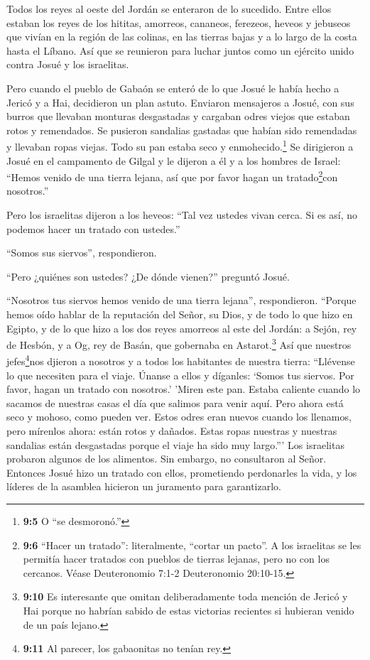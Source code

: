  Todos los reyes al oeste del Jordán se enteraron de lo
sucedido. Entre ellos estaban los reyes de los hititas, amorreos,
cananeos, ferezeos, heveos y jebuseos que vivían en la región de las
colinas, en las tierras bajas y a lo largo de la costa hasta el Líbano.
 Así que se reunieron para luchar juntos como un ejército
unido contra Josué y los israelitas.

 Pero cuando el pueblo de Gabaón se enteró de lo que Josué
le había hecho a Jericó y a Hai,  decidieron un plan astuto.
Enviaron mensajeros a Josué, con sus burros que llevaban monturas
desgastadas y cargaban odres viejos que estaban rotos y remendados.
 Se pusieron sandalias gastadas que habían sido remendadas y
llevaban ropas viejas. Todo su pan estaba seco y enmohecido.\footnote{\textbf{9:5}
  O ``se desmoronó.''}  Se dirigieron a Josué en el
campamento de Gilgal y le dijeron a él y a los hombres de Israel:
``Hemos venido de una tierra lejana, así que por favor hagan un
tratado\footnote{\textbf{9:6} ``Hacer un tratado'': literalmente,
  ``cortar un pacto''. A los israelitas se les permitía hacer tratados
  con pueblos de tierras lejanas, pero no con los cercanos. Véase
  Deuteronomio 7:1-2 Deuteronomio 20:10-15.}con nosotros.''

 Pero los israelitas dijeron a los heveos: ``Tal vez ustedes
vivan cerca. Si es así, no podemos hacer un tratado con ustedes.''

 ``Somos sus siervos'', respondieron.

``Pero ¿quiénes son ustedes? ¿De dónde vienen?'' preguntó Josué.

 ``Nosotros tus siervos hemos venido de una tierra lejana'',
respondieron. ``Porque hemos oído hablar de la reputación del Señor, su
Dios, y de todo lo que hizo en Egipto,  y de lo que hizo a
los dos reyes amorreos al este del Jordán: a Sejón, rey de Hesbón, y a
Og, rey de Basán, que gobernaba en Astarot.\footnote{\textbf{9:10} Es
  interesante que omitan deliberadamente toda mención de Jericó y Hai
  porque no habrían sabido de estas victorias recientes si hubieran
  venido de un país lejano.}  Así que nuestros
jefes\footnote{\textbf{9:11} Al parecer, los gabaonitas no tenían rey.}nos
djieron a nosotros y a todos los habitantes de nuestra tierra:
``Llévense lo que necesiten para el viaje. Únanse a ellos y díganles:
`Somos tus siervos. Por favor, hagan un tratado con nosotros.'
 'Miren este pan. Estaba caliente cuando lo sacamos de
nuestras casas el día que salimos para venir aquí. Pero ahora está seco
y mohoso, como pueden ver.  Estos odres eran nuevos cuando
los llenamos, pero mírenlos ahora: están rotos y dañados. Estas ropas
nuestras y nuestras sandalias están desgastadas porque el viaje ha sido
muy largo.'''  Los israelitas probaron algunos de los
alimentos. Sin embargo, no consultaron al Señor.  Entonces
Josué hizo un tratado con ellos, prometiendo perdonarles la vida, y los
líderes de la asamblea hicieron un juramento para garantizarlo.

